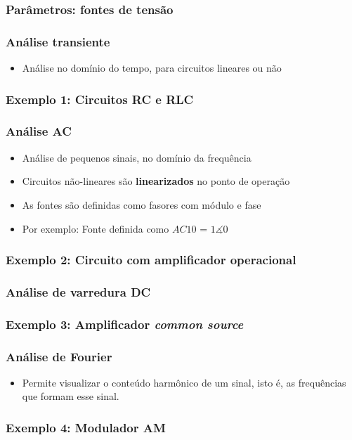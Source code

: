 \documentclass{beamer}
\begin{document}
\begin{frame}
\frametitle{Parâmetros: fontes de tensão}
\end{frame}

\begin{frame}
\frametitle{Análise transiente}
\begin{itemize}
\item{Análise no domínio do tempo, para circuitos lineares ou não}
\end{itemize}
\end{frame}

\begin{frame}
\frametitle{Exemplo 1: Circuitos RC e RLC}
\end{frame}

\begin{frame}
\frametitle{Análise AC}
\begin{itemize}
\item{Análise de pequenos sinais, no domínio da frequência}
\item{Circuitos não-lineares são \textbf{linearizados} no ponto de operação}

\item{As fontes são definidas como fasores com módulo e fase}
\item{Por exemplo: Fonte definida como $AC 1 0$ = $1\measuredangle 0$} 
\end{itemize}
\end{frame}

\begin{frame}
\frametitle{Exemplo 2: Circuito com amplificador operacional}
\end{frame}

\begin{frame}
\frametitle{Análise de varredura DC}
\end{frame}

\begin{frame}
\frametitle{Exemplo 3: Amplificador \textit{common source}}
\end{frame}

\begin{frame}
\frametitle{Análise de Fourier}
\begin{itemize}
\item Permite visualizar o conteúdo harmônico de um sinal, isto é, as frequências que formam esse sinal.
\end{itemize}
\end{frame}

\begin{frame}
\frametitle{Exemplo 4: Modulador AM}
\end{frame}
\end{document}
